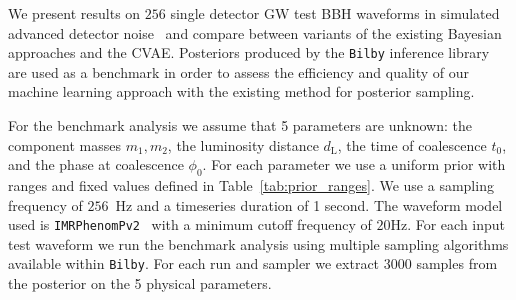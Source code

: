 \documentclass[%
showpacs,
 amsmath,amssymb,
 aps,
 twocolumn,
 prl,
 reprint,
floatfix,
]{revtex4-1}
\newcommand{\chris}[1]{\textbf{\textcolor{red}{CHRIS: #1}}}
\begin{document}
%
%

%
%
%
%
We present results on $256$ single detector \ac{GW} test \ac{BBH} waveforms in
simulated advanced detector noise~\cite{aligo_noisecurves} and compare between
variants of the existing Bayesian approaches and the \ac{CVAE}. Posteriors
produced by the \texttt{Bilby} inference library~\cite{1811.02042} are used as
a benchmark in order to assess the efficiency and quality of our machine
learning approach with the existing method for posterior sampling.

%
%
For the benchmark analysis we assume that 5 parameters are unknown: the
component masses $m_1,m_2$, the luminosity distance $d_{\text{L}}$, the time of
coalescence $t_{0}$, and the phase at coalescence $\phi_0$. For each
parameter we use a uniform prior with ranges and fixed values defined in
Table~\ref{tab:prior_ranges}.
We use a sampling frequency of $256$~Hz and a timeseries duration of 1 second.
The waveform model used is \texttt{IMRPhenomPv2}~\cite{1809.10113} with a
minimum cutoff frequency of $20$Hz. For each input test waveform we run the
benchmark analysis using multiple sampling algorithms available within
\texttt{Bilby}. For each run and sampler we extract $3000$ samples from the
posterior on the 5 physical parameters.  
\end{document}
